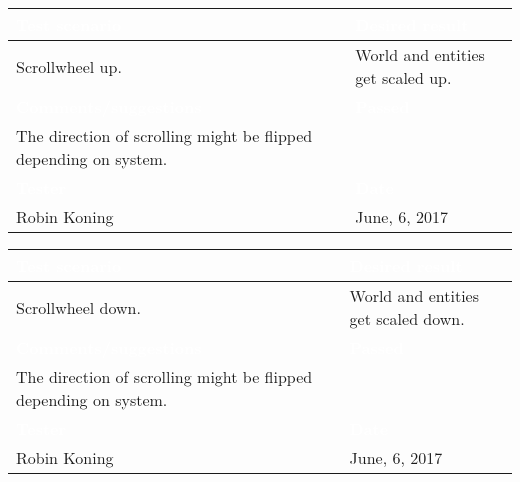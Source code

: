 \begin{tabularx}{\textwidth}{|X|X|}
\hline
\rowcolor{lightgray}\textcolor{white}{\textbf{Test scenario}} &
\textcolor{white}{\textbf{Desired result}}       
\\\hline
Scrollwheel up. &
World and entities get scaled up.         
\\\hline
\rowcolor{lightgray}\textcolor{white}{\textbf{Comments/suggestions}} & 
\textcolor{white}{\textbf{Passed}}
\\\hline
The direction of scrolling might be flipped depending on system. & \cellcolor{green}                       
\\\hline
\rowcolor{lightgray}\textcolor{white}{\textbf{Tester}} & 
\textcolor{white}{\textbf{Date}}               
\\\hline
Robin Koning & June, 6, 2017                               		 
\\\hline
\end{tabularx}

\begin{tabularx}{\textwidth}{|X|X|}
\hline
\rowcolor{lightgray}\textcolor{white}{\textbf{Test scenario}} &
\textcolor{white}{\textbf{Desired result}}       
\\\hline
Scrollwheel down. &
World and entities get scaled down.         
\\\hline
\rowcolor{lightgray}\textcolor{white}{\textbf{Comments/suggestions}} & 
\textcolor{white}{\textbf{Passed}}
\\\hline
The direction of scrolling might be flipped depending on system. & \cellcolor{green}                       
\\\hline
\rowcolor{lightgray}\textcolor{white}{\textbf{Tester}} & 
\textcolor{white}{\textbf{Date}}               
\\\hline
Robin Koning & June, 6, 2017                               		 
\\\hline
\end{tabularx}
